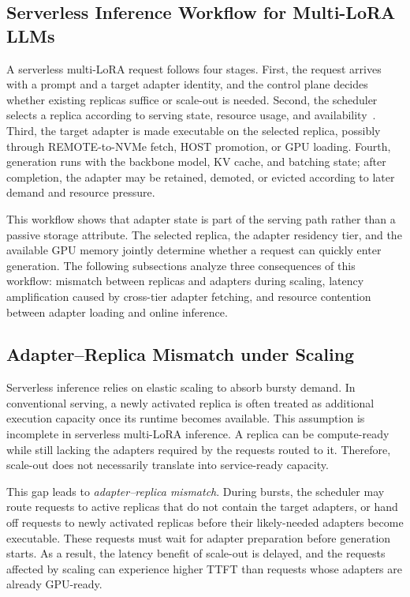 \documentclass[lettersize,journal]{IEEEtran}
\begin{document}
\subsection{Serverless Inference Workflow for Multi-LoRA LLMs}

A serverless multi-LoRA request follows four stages. First, the request arrives with a prompt and a target adapter identity, and the control plane decides whether existing replicas suffice or scale-out is needed. Second, the scheduler selects a replica according to serving state, resource usage, and availability~\cite{AdaptiveTransmissionScheduling}. Third, the target adapter is made executable on the selected replica, possibly through REMOTE-to-NVMe fetch, HOST promotion, or GPU loading. Fourth, generation runs with the backbone model, KV cache, and batching state; after completion, the adapter may be retained, demoted, or evicted according to later demand and resource pressure.

This workflow shows that adapter state is part of the serving path rather than a passive storage attribute. The selected replica, the adapter residency tier, and the available GPU memory jointly determine whether a request can quickly enter generation. The following subsections analyze three consequences of this workflow: mismatch between replicas and adapters during scaling, latency amplification caused by cross-tier adapter fetching, and resource contention between adapter loading and online inference.

\subsection{Adapter--Replica Mismatch under Scaling}

Serverless inference relies on elastic scaling to absorb bursty demand. In conventional serving, a newly activated replica is often treated as additional execution capacity once its runtime becomes available. This assumption is incomplete in serverless multi-LoRA inference. A replica can be compute-ready while still lacking the adapters required by the requests routed to it. Therefore, scale-out does not necessarily translate into service-ready capacity.

This gap leads to \emph{adapter--replica mismatch}. During bursts, the scheduler may route requests to active replicas that do not contain the target adapters, or hand off requests to newly activated replicas before their likely-needed adapters become executable. These requests must wait for adapter preparation before generation starts. As a result, the latency benefit of scale-out is delayed, and the requests affected by scaling can experience higher TTFT than requests whose adapters are already GPU-ready.
\end{document}
